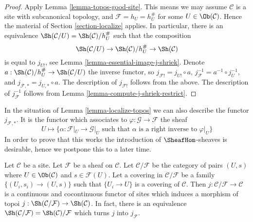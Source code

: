 \begin{proof}
Apply
Lemma \ref{lemma-topos-good-site}.
This means we may assume $\mathcal{C}$ is a site
with subcanonical topology, and $\mathcal{F} = h_U = h_U^\#$
for some $U \in \Ob(\mathcal{C})$.
Hence the material of
Section \ref{section-localize}
applies. In particular, there is an equivalence
$\Sh(\mathcal{C}/U) = \Sh(\mathcal{C})/h_U^\#$
such that the composition
$$
\Sh(\mathcal{C}/U)
\to
\Sh(\mathcal{C})/h_U^\#
\to \Sh(\mathcal{C})
$$
is equal to $j_{U!}$, see
Lemma \ref{lemma-essential-image-j-shriek}.
Denote
$a : \Sh(\mathcal{C})/h_U^\# \to \Sh(\mathcal{C}/U)$
the inverse functor, so $j_{\mathcal{F}!} = j_{U!} \circ a$,
$j_\mathcal{F}^{-1} = a^{-1} \circ j_U^{-1}$, and
$j_{\mathcal{F}, *} = j_{U, *} \circ a$. The description of
$j_{\mathcal{F}!}$ follows from the above. The description of
$j_\mathcal{F}^{-1}$ follows from
Lemma \ref{lemma-compute-j-shriek-restrict}.
\end{proof}

\begin{remark}
\label{remark-localize-pushforward}
In the situation of
Lemma \ref{lemma-localize-topos}
we can also describe the functor $j_{\mathcal{F}, *}$.
It is the functor which associates to
$\varphi : \mathcal{G} \to \mathcal{F}$ the
sheaf
$$
U
\longmapsto
\{\alpha : \mathcal{F}|_U \to \mathcal{G}|_U
\text{ such that } \alpha \text{ is a right inverse to }\varphi|_U \}
$$
In order to prove that this works the introduction
of $\SheafHom$-sheaves is desirable, hence we postpone this to
a later time.
\end{remark}

\begin{lemma}
\label{lemma-localize-topos-site}
Let $\mathcal{C}$ be a site. Let $\mathcal{F}$ be a sheaf on $\mathcal{C}$.
Let $\mathcal{C}/\mathcal{F}$ be the category of pairs $(U, s)$ where
$U \in \Ob(\mathcal{C})$ and $s \in \mathcal{F}(U)$. Let a covering in
$\mathcal{C}/\mathcal{F}$ be a family $\{(U_i, s_i) \to (U, s)\}$
such that $\{U_i \to U\}$ is a covering of $\mathcal{C}$.
Then $j : \mathcal{C}/\mathcal{F} \to \mathcal{C}$ is a continuous
and cocontinuous functor of sites which induces a morphism of topoi
$j : \Sh(\mathcal{C}/\mathcal{F}) \to \Sh(\mathcal{C})$. In fact, there
is an equivalence $\Sh(\mathcal{C}/\mathcal{F}) =
\Sh(\mathcal{C})/\mathcal{F}$ which turns $j$ into $j_\mathcal{F}$.
\end{lemma}

